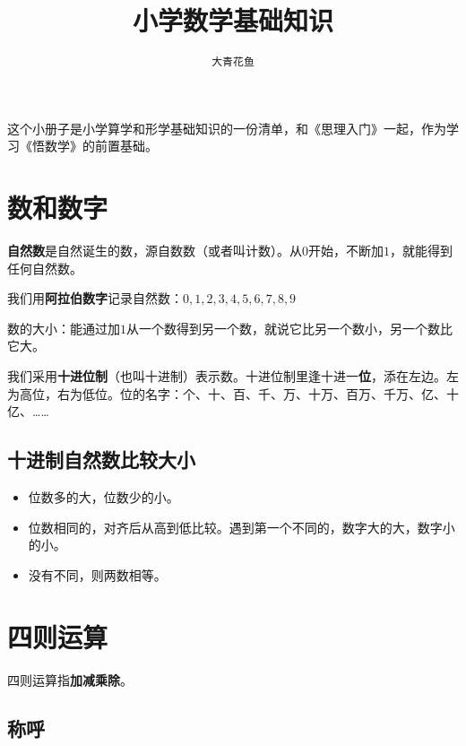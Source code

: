 \documentclass[12pt,UTF8]{ctexart}
\title{\zihao{0} \bfseries 小学数学基础知识}
\author{\zihao{2} \texttt{大青花鱼}}
\date{}
\begin{document}
\maketitle
\tableofcontents
\newpage


\begin{center}
\end{center}


这个小册子是小学算学和形学基础知识的一份清单，和《思理入门》一起，作为学习《悟数学》的前置基础。

\section{数和数字}

\textbf{自然数}是自然诞生的数，源自数数（或者叫计数）。从\( 0 \)开始，不断加\( 1 \)，就能得到任何自然数。

我们用\textbf{阿拉伯数字}记录自然数：\( 0,1,2,3,4,5,6,7,8,9 \)

数的大小：能通过加\( 1 \)从一个数得到另一个数，就说它比另一个数小，另一个数比它大。

我们采用\textbf{十进位制}（也叫十进制）表示数。十进位制里逢十进一\textbf{位}，添在左边。左为高位，右为低位。位的名字：个、十、百、千、万、十万、百万、千万、亿、十亿、……

\subsection{十进制自然数比较大小}

\begin{itemize}
\item 位数多的大，位数少的小。
\item 位数相同的，对齐后从高到低比较。遇到第一个不同的，数字大的大，数字小的小。
\item 没有不同，则两数相等。
\end{itemize}

\section{四则运算}

四则运算指\textbf{加减乘除}。

\subsection{称呼}
\end{document}
